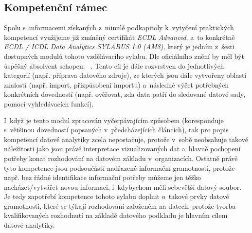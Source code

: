 \hypertarget{kompetenux10dnuxed-ruxe1mec}{%
\subsection{Kompetenční rámec}\label{kompetenux10dnuxed-ruxe1mec}}

Spolu s~informacemi získaných z~minulé podkapitoly k~vytyčení praktických kompetencí využijeme již zmíněný certifikát \emph{ECDL Advanced}, a~to konkrétně \emph{ECDL / ICDL Data Analytics SYLABUS 1.0 (AM8)}, který je jedním z~šesti dostupných modulů tohoto vzdělávacího sylabu. Dle oficiálního znění by měl být úspěšný absolvent schopen: ~\parencite{ecdl17}. Tento cíl je dále rozvrstven do jednotlivých kategorií (např. příprava datového zdroje), ze kterých jsou dále vytvořeny oblasti znalostí (např. import, přizpůsobení importu) a~následně výčet potřebných konkrétních dovedností (např. ověřovat, zda data patří do sledované datové sady, pomocí vyhledávacích funkcí).

I~když je tento modul zpracován vyčerpávajícím způsobem (koresponduje s~většinou dovedností popsaných v~předcházejících článcích), tak pro popis kompetencí datové analytiky zcela nepostačuje, protože v~sobě neobsahuje takové náležitosti jako jsou právě interpretace vizualizovaných dat a~hlavně pochopení potřeby konat rozhodování na datovém základu v~organizacích. Ostatně právě tyto kompetence jsou podsoučástí nadřazené informační gramotnosti, protože např. bez řádné identifikace informační potřeby můžeme jen těžko nacházet/vytvářet novou informaci, i~kdybychom měli sebevětší datový soubor. Je tedy zapotřebí kompetence tohoto sylabu doplnit o~takové prvky datové gramotnosti, které se týkají rozhodování založeném na datech, protože tvorba kvalifikovaných rozhodnutí na základě datového podkladu je hlavním cílem datové analytiky.
